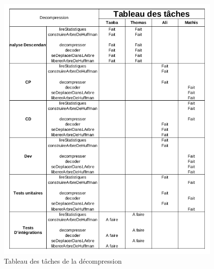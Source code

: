     \begin{figure}[h] 
            \centering      
        \includegraphics[width=1.1\textwidth]{decompressionTableau.png}
        \caption{Tableau des tâches de la décompression}
        \label{fig:exemple}
    \end{figure}